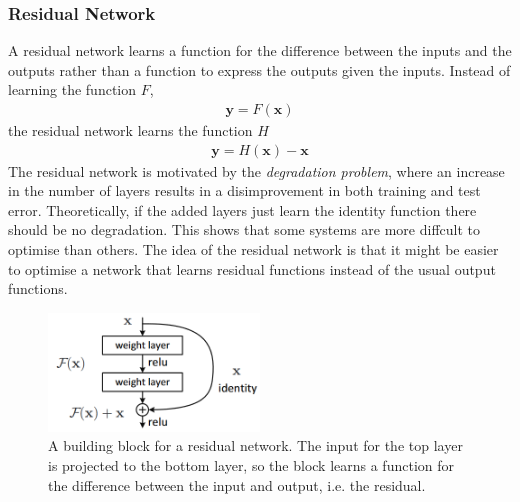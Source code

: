 \documentclass[a4paper,12pt]{article}
\theoremstyle{definition}
\begin{document}
\subsubsection{Residual Network \cite{resnet}}
A residual network learns a function for the difference between the inputs and the outputs rather than a function to express the outputs given the inputs. Instead of learning the function $F$,
\begin{align}
	\mathbf{y} = F(\mathbf{x})
\end{align}
the residual network learns the function $H$
\begin{align}
	\mathbf{y} = H(\mathbf{x}) - \mathbf{x}
\end{align}
 The residual network is motivated by the \textit{degradation problem}, where an increase in the number of layers results in a disimprovement in both training and test error. Theoretically, if the added layers just learn the identity function there should be no degradation. This shows that some systems are more diffcult to optimise than others. The idea of the residual network is that it might be easier to optimise a network that learns residual functions instead of the usual output functions.

\begin{figure}[ht]
	\centering
	\includegraphics[width=0.5\textwidth]{figures/residual_rnn.png}
	\caption{A building block for a residual network. The input for the top layer is projected to the bottom layer, so the block learns a function for the difference between the input and output, i.e. the residual.}
	\label{fig:residual_rnn}
\end{figure}
\end{document}
